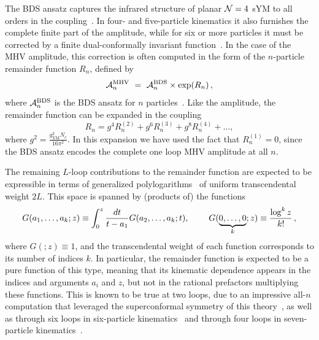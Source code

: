 \documentclass[11pt]{article}
\begin{document}
The BDS ansatz captures the infrared structure of planar ${\cal N} = 4$ sYM to all orders in the coupling~\cite{Bern:2005iz}. In four- and five-particle kinematics it also furnishes the complete finite part of the amplitude, while for six or more particles it must be corrected by a finite dual-conformally invariant function~\cite{Drummond:2007au,Bern:2008ap,Drummond:2008aq}. In the case of the MHV amplitude, this correction is often computed in the form of the $n$-particle remainder function $R_n$, defined by
\begin{equation} \label{eq:remainder_function}
\mathcal{A}_n^{\rm MHV}\ =\ \mathcal{A}_n^{\rm BDS}  \times \exp(R_n)\,,
\end{equation}
where $\mathcal{A}_n^{\rm BDS}$ is the BDS ansatz for $n$ particles~\cite{Bern:2005iz}. Like the amplitude, the remainder function can be expanded in the coupling
\begin{equation}
R_n = g^4 R_n^{(2)} + g^6 R_n^{(3)} + g^8 R_n^{(4)} + \dots ,
\end{equation}
where $g^2 = \frac{g_{\text{YM}}^2 N_c}{16 \pi^2}$. In this expansion we have used the fact that $R_n^{(1)} = 0$, since the BDS ansatz encodes the complete one loop MHV amplitude at all $n$. 

The remaining $L$-loop contributions to the remainder function are expected to be expressible in terms of generalized polylogarithms~\cite{Chen,FBThesis,Gonch} of uniform transcendental weight $2L$. This space is spanned by (products of) the functions
\begin{equation} \label{eq:multiple_polylogs}
G(a_1, \dots, a_k; z) \equiv \int_0^z \frac{dt}{t-a_1} G(a_2,\dots,a_k; t), \hspace{0.8cm} G(\underbrace{0,\dots,0}_k;z) \equiv \frac{\log^k z}{k!}\, ,
\end{equation}
where $G(;z) \equiv 1$, and the transcendental weight of each function corresponds to its number of indices $k$. In particular, the remainder function is expected to be a pure function of this type, meaning that its kinematic dependence appears in the indices and arguments $a_i$ and $z$, but not in the rational prefactors multiplying these functions. This is known to be true at two loops, due to an impressive all-$n$ computation that leveraged the superconformal symmetry of this theory~\cite{CaronHuot:2011ky}, as well as through six loops in six-particle kinematics~\cite{Dixon:2013eka,Dixon:2014voa,Caron-Huot:2016owq,cosmic_galois_paper} and through four loops in seven-particle kinematics~\cite{Drummond:2014ffa,Dixon:2016nkn}. 
\end{document}
